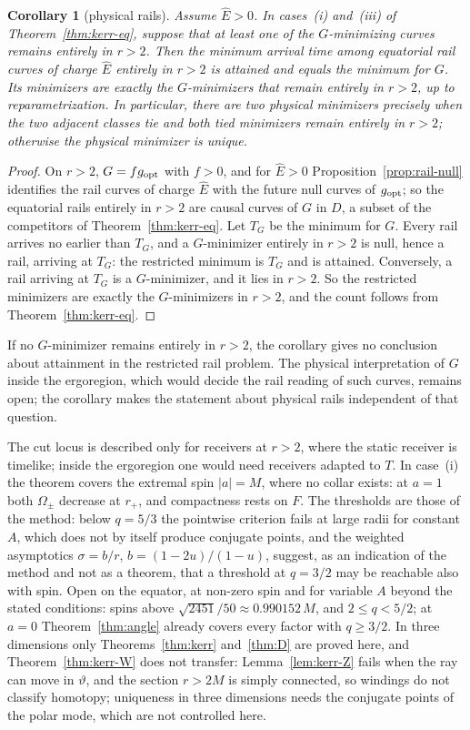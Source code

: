 \documentclass[aip,jmp,amsmath,amssymb,reprint]{revtex4-2}
\newcommand{\Ehat}{\hat E}
\newcommand{\gopt}{g_{\rm opt}}
\theoremstyle{plain}
\newtheorem{corollary}[proposition]{Corollary}
\theoremstyle{definition}
\begin{document}
\begin{corollary}[physical rails]\label{cor:kerr-rails}
Assume $\Ehat>0$. In cases~(i) and~(iii) of Theorem~\ref{thm:kerr-eq}, suppose that at least one of the
$G$-minimizing curves remains entirely in $r>2$. Then the minimum arrival time among equatorial rail
curves of charge $\Ehat$ entirely in $r>2$ is attained and equals the minimum for $G$. Its minimizers
are exactly the $G$-minimizers that remain entirely in $r>2$, up to reparametrization. In
particular, there are two physical minimizers precisely when the two adjacent classes tie and
both tied minimizers remain entirely in $r>2$; otherwise the physical minimizer is unique.
\end{corollary}

\begin{proof}
On $r>2$, $G=f\gopt$ with $f>0$, and for $\Ehat>0$ Proposition~\ref{prop:rail-null} identifies the rail curves
of charge $\Ehat$ with the future null curves of $\gopt$; so the equatorial rails entirely in $r>2$ are
causal curves of $G$ in $D$, a subset of the competitors of Theorem~\ref{thm:kerr-eq}. Let $T_G$ be the
minimum for $G$. Every rail arrives no earlier than $T_G$, and a $G$-minimizer entirely in $r>2$ is null,
hence a rail, arriving at $T_G$: the restricted minimum is $T_G$ and is attained. Conversely, a rail
arriving at $T_G$ is a $G$-minimizer, and it lies in $r>2$. So the restricted minimizers are exactly
the $G$-minimizers in $r>2$, and the count follows from Theorem~\ref{thm:kerr-eq}.
\end{proof}

If no $G$-minimizer remains entirely in $r>2$, the corollary gives no conclusion about attainment in
the restricted rail problem. The physical interpretation of $G$ inside the ergoregion, which would
decide the rail reading of such curves, remains open; the corollary makes the statement about
physical rails independent of that question.

The cut locus is described only for receivers at $r>2$, where the static receiver is timelike;
inside the ergoregion one would need receivers adapted to $T$. In case~(i) the theorem covers the
extremal spin $|a|=M$, where no collar exists: at $a=1$ both $\Omega_\pm$ decrease at $r_+$, and
compactness rests on $F$. The thresholds are those of the method: below $q=5/3$ the pointwise
criterion fails at large radii for constant $A$, which does not by itself produce conjugate
points, and the weighted asymptotics $\sigma=b/r$, $b=(1-2u)/(1-u)$, suggest, as an indication of the
method and not as a theorem, that a threshold at $q=3/2$ may be reachable also with spin. Open on
the equator, at non-zero spin and for variable $A$ beyond the stated conditions: spins above
$\sqrt{2451}/50\approx0.990152\,M$, and $2\le q<5/2$; at $a=0$ Theorem~\ref{thm:angle} already covers every
factor with $q\ge3/2$. In three dimensions only Theorems~\ref{thm:kerr} and~\ref{thm:D} are proved here, and
Theorem~\ref{thm:kerr-W} does not transfer: Lemma~\ref{lem:kerr-Z} fails when the ray
can move in $\vartheta$, and the section $r>2M$ is simply connected, so windings do not classify
homotopy; uniqueness in three dimensions needs the conjugate points of the polar mode, which
are not controlled here.
\end{document}
